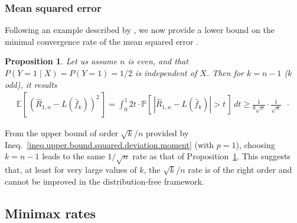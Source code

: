 \documentclass[twoside,11pt]{article}
\numberwithin{equation}{section}
\newtheorem{prop}{Proposition}[section]
\newcommand{\1}{\mathds{1}}%
\newcommand{\paren}[1]{\left( #1 \right)}
\newcommand{\croch}[1]{\left[\, #1 \,\right]}
\newcommand{\abs}[1]{\left\lvert #1 \right\rvert} %
\newcommand{\E}{\mathbb{E}}
\renewcommand{\P}{\mathbb{P}}
\newcommand{\Rh}{\widehat{R}}
\newcommand{\A}{\mathcal{A}}
\numberwithin{equation}{section}
\theoremstyle{plain}
\begin{document}
\subsubsection{Mean squared error}


Following an example described by \cite{DevWag_79potential}, we now provide a lower bound on the minimal convergence rate of the mean squared error \cite[see also][Chap.~24.4, p.415  for a similar argument]{DeGyLu_1996}.
%
\begin{prop}\label{res.lower.bound.EQM}
	Let us assume $n$ is even, and that $P( Y=1\mid X )  =P(Y=1 )  = 1/2$ is independent of $X$.
%
Then for $k=n-1$ ($k$ odd), it results
\begin{align*}
\E\croch{ \paren{ \Rh_{1,n}-L(\hat f_k) }^2 } = \int_{0}^1 2 t \cdot \P\croch { \abs{ \Rh_{1,n}-L(\hat f_k) }> t }\, dt \geq \frac{1}{8\sqrt{\pi}} \cdot \frac{1}{\sqrt{n}} \enspace \cdot
\end{align*}
\end{prop}
%
From the upper bound of order $\sqrt{k}/n$ provided by Ineq.~\eqref{ineq.upper.bound.squared.deviation.moment} (with $p=1$), choosing $k=n-1$ leads to the same $1/\sqrt{n}$ rate as that of Proposition~\ref{res.lower.bound.EQM}.
%
This suggests that, at least for very large values of $k$, the  $\sqrt{k}/n$ rate is of the right order and cannot be improved in the distribution-free framework.


\subsection{Minimax rates}
\end{document}
